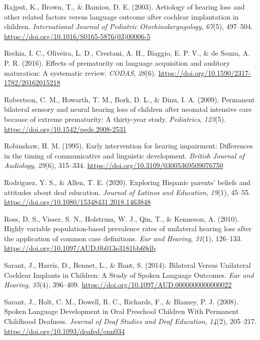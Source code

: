 \documentclass[english,man]{apa6}
\begin{document}
\leavevmode\hypertarget{ref-rajput2003}{}%
Rajput, K., Brown, T., \& Bamiou, D. E. (2003). Aetiology of hearing loss and other related factors versus language outcome after cochlear implantation in children. \emph{International Journal of Pediatric Otorhinolaryngology}, \emph{67}(5), 497--504. \url{https://doi.org/10.1016/S0165-5876(03)00006-5}

\leavevmode\hypertarget{ref-rechia2016}{}%
Rechia, I. C., Oliveira, L. D., Crestani, A. H., Biaggio, E. P. V., \& de Souza, A. P. R. (2016). Effects of prematurity on language acquisition and auditory maturation: A systematic review. \emph{CODAS}, \emph{28}(6). \url{https://doi.org/10.1590/2317-1782/20162015218}

\leavevmode\hypertarget{ref-robertson2009}{}%
Robertson, C. M., Howarth, T. M., Bork, D. L., \& Dinu, I. A. (2009). Permanent bilateral sensory and neural hearing loss of children after neonatal intensive care because of extreme prematurity: A thirty-year study. \emph{Pediatrics}, \emph{123}(5). \url{https://doi.org/10.1542/peds.2008-2531}

\leavevmode\hypertarget{ref-robinshaw1995}{}%
Robinshaw, H. M. (1995). Early intervention for hearing impairment: Differences in the timing of communicative and linguistic development. \emph{British Journal of Audiology}, \emph{29}(6), 315--334. \url{https://doi.org/10.3109/03005369509076750}

\leavevmode\hypertarget{ref-rodriguez2020}{}%
Rodriguez, Y. S., \& Allen, T. E. (2020). Exploring Hispanic parents' beliefs and attitudes about deaf education. \emph{Journal of Latinos and Education}, \emph{19}(1), 45--55. \url{https://doi.org/10.1080/15348431.2018.1463848}

\leavevmode\hypertarget{ref-ross2010}{}%
Ross, D. S., Visser, S. N., Holstrum, W. J., Qin, T., \& Kenneson, A. (2010). Highly variable population-based prevalence rates of unilateral hearing loss after the application of common case definitions. \emph{Ear and Hearing}, \emph{31}(1), 126--133. \url{https://doi.org/10.1097/AUD.0b013e3181bb69db}

\leavevmode\hypertarget{ref-sarant2014}{}%
Sarant, J., Harris, D., Bennet, L., \& Bant, S. (2014). Bilateral Versus Unilateral Cochlear Implants in Children: A Study of Spoken Language Outcomes. \emph{Ear and Hearing}, \emph{35}(4), 396--409. \url{https://doi.org/10.1097/AUD.0000000000000022}

\leavevmode\hypertarget{ref-sarant2008}{}%
Sarant, J., Holt, C. M., Dowell, R. C., Richards, F., \& Blamey, P. J. (2008). Spoken Language Development in Oral Preschool Children With Permanent Childhood Deafness. \emph{Journal of Deaf Studies and Deaf Education}, \emph{14}(2), 205--217. \url{https://doi.org/10.1093/deafed/enn034}
\end{document}
